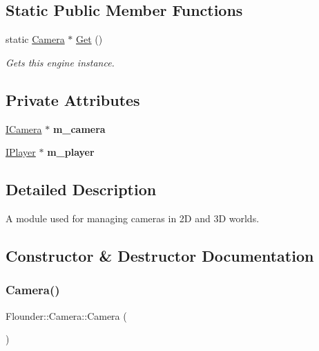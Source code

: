 \subsection*{Static Public Member Functions}
\begin{DoxyCompactItemize}
\item 
static \hyperlink{class_flounder_1_1_camera}{Camera} $\ast$ \hyperlink{class_flounder_1_1_camera_ab7e180abb10b8b0e4dd1009565174a53}{Get} ()
\begin{DoxyCompactList}\small\item\em Gets this engine instance. \end{DoxyCompactList}\end{DoxyCompactItemize}
\subsection*{Private Attributes}
\begin{DoxyCompactItemize}
\item 
\mbox{\label{class_flounder_1_1_camera_aab713eeb693198fab9df85c67aa3bb4d}} 
\hyperlink{class_flounder_1_1_i_camera}{I\+Camera} $\ast$ {\bfseries m\+\_\+camera}
\item 
\mbox{\label{class_flounder_1_1_camera_a6a4125084bb47c0ada668286060f354f}} 
\hyperlink{class_flounder_1_1_i_player}{I\+Player} $\ast$ {\bfseries m\+\_\+player}
\end{DoxyCompactItemize}


\subsection{Detailed Description}
A module used for managing cameras in 2D and 3D worlds. 



\subsection{Constructor \& Destructor Documentation}
\mbox{\label{class_flounder_1_1_camera_ae1b692ec2be6286b102f4fd0ca2db02c}} 
\subsubsection{\texorpdfstring{Camera()}{Camera()}}
{\footnotesize\ttfamily Flounder\+::\+Camera\+::\+Camera (\begin{DoxyParamCaption}{ }\end{DoxyParamCaption})}



